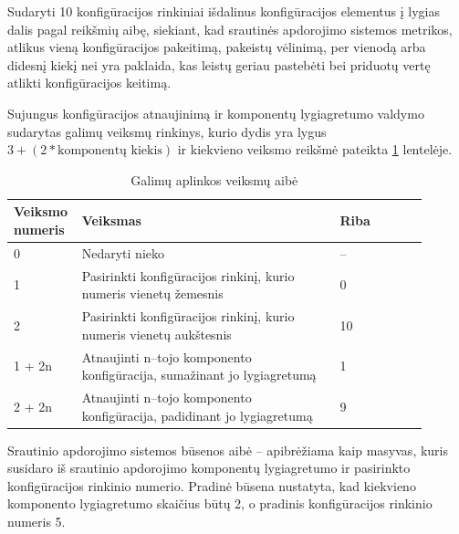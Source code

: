 \documentclass{VUMIFPSbakalaurinis}
\begin{document}
Sudaryti 10 konfigūracijos rinkiniai išdalinus konfigūracijos elementus į lygias dalis pagal reikšmių aibę, siekiant, kad srautinės apdorojimo sistemos metrikos, atlikus vieną konfigūracijos pakeitimą, pakeistų vėlinimą, per vienodą arba didesnį kiekį nei yra paklaida, kas leistų geriau pastebėti bei priduotų vertę atlikti konfigūracijos keitimą.

Sujungus konfigūracijos atnaujinimą ir komponentų lygiagretumo valdymo sudarytas galimų veiksmų rinkinys, kurio dydis yra lygus \(3 + (2 * \text{komponentų kiekis})\) ir kiekvieno veiksmo reikšmė pateikta \ref{action–space} lentelėje.

\begin{longtable}{|p{0.1\linewidth}|p{0.6\linewidth}|p{0.1\linewidth}|p{0.1\linewidth}|}
    \caption{Galimų aplinkos veiksmų aibė}
    \label{action–space}\\
    \hline
    \rowcolor[HTML]{C0C0C0} 
    Veiksmo numeris                 & Veiksmas & Riba      \\ \hline
    \endfirsthead
    \endhead
    0                               & Nedaryti nieko & –  \\ \hline
    1                               & Pasirinkti konfigūracijos rinkinį, kurio numeris vienetų žemesnis & 0  \\ \hline
    2                               & Pasirinkti konfigūracijos rinkinį, kurio numeris vienetų aukštesnis & 10 \\ \hline
    1 + 2n                          & Atnaujinti n–tojo komponento konfigūracija, sumažinant jo lygiagretumą & 1 \\ \hline
    2 + 2n                          & Atnaujinti n–tojo komponento konfigūracija, padidinant jo lygiagretumą & 9 \\ \hline
\end{longtable}

Srautinio apdorojimo sistemos būsenos aibė – apibrėžiama kaip masyvas, kuris susidaro iš srautinio apdorojimo komponentų lygiagretumo ir pasirinkto konfigūracijos rinkinio numerio. Pradinė būsena nustatyta, kad kiekvieno komponento lygiagretumo skaičius būtų 2, o pradinis konfigūracijos rinkinio numeris 5.
\end{document}
